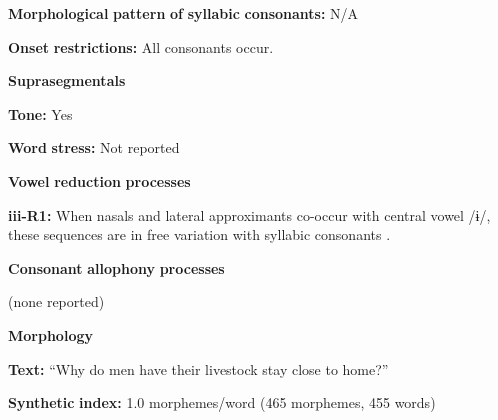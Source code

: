 \begin{styleBody}
\textbf{Morphological} \textbf{pattern} \textbf{of} \textbf{syllabic} \textbf{consonants:} N/A
\end{styleBody}

\begin{styleBody}
\textbf{Onset} \textbf{restrictions:} All consonants occur.
\end{styleBody}

\begin{styleBody}
\textbf{Suprasegmentals}
\end{styleBody}

\begin{styleBody}
\textbf{Tone:} Yes
\end{styleBody}

\begin{styleBody}
\textbf{Word} \textbf{stress:} Not reported
\end{styleBody}

\begin{styleBody}
\textbf{Vowel} \textbf{reduction} \textbf{processes}
\end{styleBody}

\begin{styleBody}
\textbf{iii-R1:} When nasals and lateral approximants co-occur with central vowel /ɨ/, these sequences are in free variation with syllabic consonants \citep[31]{Gerner2013}.
\end{styleBody}

\begin{styleBody}
\textbf{Consonant} \textbf{allophony} \textbf{processes}
\end{styleBody}

\begin{styleBody}
(none reported)
\end{styleBody}

\begin{styleBody}
\textbf{Morphology}
\end{styleBody}

\begin{styleBody}
\textbf{Text:} “Why do men have their livestock stay close to home?” \citep[525-530]{Gerner2013}
\end{styleBody}

\begin{styleBody}
\textbf{Synthetic} \textbf{index:} 1.0 morphemes/word (465 morphemes, 455 words)
\end{styleBody}


